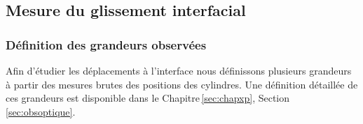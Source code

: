 %
%
%


\subsection{Mesure du glissement interfacial}

\subsubsection{Définition des grandeurs observées}

Afin d'étudier les déplacements à l'interface nous définissons plusieurs grandeurs à partir des mesures brutes des positions des cylindres. Une définition détaillée de ces grandeurs est disponible dans le Chapitre\,\ref{sec:chapxp}, Section\,\ref{sec:obsoptique}.

